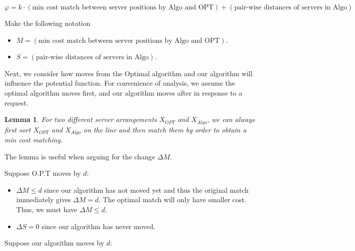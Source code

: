 \documentclass[11pt]{article}
\newtheorem{lemma}[fact]{Lemma}
\begin{document}
$$\varphi = k \cdot (\text{min cost match between server positions by Algo and OPT}) + (\text{pair-wise distances of servers in Algo})$$

Make the following notation
\begin{itemize}
    \item  $M = (\text{min cost match between server positions by Algo and OPT})$.
    \item  $S = (\text{pair-wise distances of servers in Algo})$.
\end{itemize}



Next, we consider how moves from the Optimal algorithm and our algorithm will influence the potential function. For convenience of analysis, we assume the optimal algorithm moves first, and our algorithm moves after in response to a request.

\begin{lemma}
For two different server arrangements $X_{OPT}$ and $X_{{Algo}}$, we can always first sort $X_{OPT}$ and $X_{Algo}$ on the line and then match them by order to obtain a min cost matching.
\end{lemma}

The lemma is useful when arguing for the change $\Delta{M}$.

Suppose O.P.T moves by $d$:
\begin{itemize}
    \item $\Delta{M} \leq d$ since our algorithm has not moved yet and thus the original match immediately gives $\Delta{M} = d$. The optimal match will only have smaller cost. Thus, we must have $\Delta{M} \leq d$.
    \item $\Delta{S} = 0$ since our algorithm has never moved.
\end{itemize}

Suppose our algorithm moves by $d$:
\end{document}
